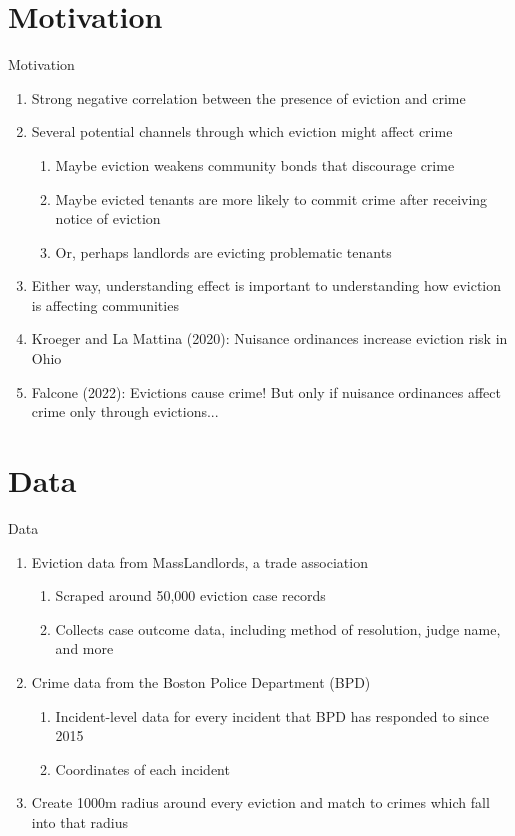 \documentclass [xcolor=svgnames, t] {beamer}
\begin{document}
\section{Motivation}


\begin{frame}{Motivation}
\begin{enumerate}
    \item Strong negative correlation between the presence of eviction and crime
    \item Several potential channels through which eviction might affect crime
    \begin{enumerate}
        \item Maybe eviction weakens community bonds that discourage crime
        \item Maybe evicted tenants are more likely to commit crime after receiving notice of eviction
        \item Or, perhaps landlords are evicting problematic tenants
    \end{enumerate}
    \item Either way, understanding effect is important to understanding how eviction is affecting communities
    \item Kroeger and La Mattina (2020): Nuisance ordinances increase eviction risk in Ohio
    \item Falcone (2022): Evictions cause crime! But only if nuisance ordinances affect crime only through evictions...
\end{enumerate}
\end{frame}

\section{Data}
\begin{frame}{Data}
    \begin{enumerate}
        \item Eviction data from MassLandlords, a trade association
        \begin{enumerate}
            \item Scraped around 50,000 eviction case records
            \item Collects case outcome data, including method of resolution, judge name, and more
        \end{enumerate}
        \item Crime data from the Boston Police Department (BPD)
        \begin{enumerate}
            \item Incident-level data for every incident that BPD has responded to since 2015
            \item Coordinates of each incident
        \end{enumerate}
        \item Create 1000m radius around every eviction and match to crimes which fall into that radius
    \end{enumerate}
\end{frame}
\end{document}
